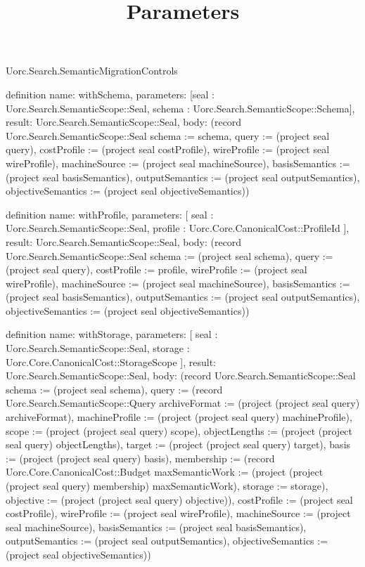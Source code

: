 \begin{lexlean}{Uorc.Search.SemanticMigrationControls}
\title{Parameters}
\begin{semanticmodule}
definition{
  name: withSchema,
  parameters: [seal : Uorc.Search.SemanticScope::Seal, schema : Uorc.Search.SemanticScope::Schema],
  result: Uorc.Search.SemanticScope::Seal,
  body: (record Uorc.Search.SemanticScope::Seal {schema := schema, query := (project seal query), costProfile := (project seal costProfile), wireProfile := (project seal wireProfile), machineSource := (project seal machineSource), basisSemantics := (project seal basisSemantics), outputSemantics := (project seal outputSemantics), objectiveSemantics := (project seal objectiveSemantics)})
}

definition{
  name: withProfile,
  parameters: [
    seal : Uorc.Search.SemanticScope::Seal,
    profile : Uorc.Core.CanonicalCost::ProfileId
  ],
  result: Uorc.Search.SemanticScope::Seal,
  body: (record Uorc.Search.SemanticScope::Seal {schema := (project seal schema), query := (project seal query), costProfile := profile, wireProfile := (project seal wireProfile), machineSource := (project seal machineSource), basisSemantics := (project seal basisSemantics), outputSemantics := (project seal outputSemantics), objectiveSemantics := (project seal objectiveSemantics)})
}

definition{
  name: withStorage,
  parameters: [
    seal : Uorc.Search.SemanticScope::Seal,
    storage : Uorc.Core.CanonicalCost::StorageScope
  ],
  result: Uorc.Search.SemanticScope::Seal,
  body: (record Uorc.Search.SemanticScope::Seal {schema := (project seal schema), query := (record Uorc.Search.SemanticScope::Query {archiveFormat := (project (project seal query) archiveFormat), machineProfile := (project (project seal query) machineProfile), scope := (project (project seal query) scope), objectLengths := (project (project seal query) objectLengths), target := (project (project seal query) target), basis := (project (project seal query) basis), membership := (record Uorc.Core.CanonicalCost::Budget {maxSemanticWork := (project (project (project seal query) membership) maxSemanticWork), storage := storage}), objective := (project (project seal query) objective)}), costProfile := (project seal costProfile), wireProfile := (project seal wireProfile), machineSource := (project seal machineSource), basisSemantics := (project seal basisSemantics), outputSemantics := (project seal outputSemantics), objectiveSemantics := (project seal objectiveSemantics)})
}


\end{semanticmodule}
\end{lexlean}
